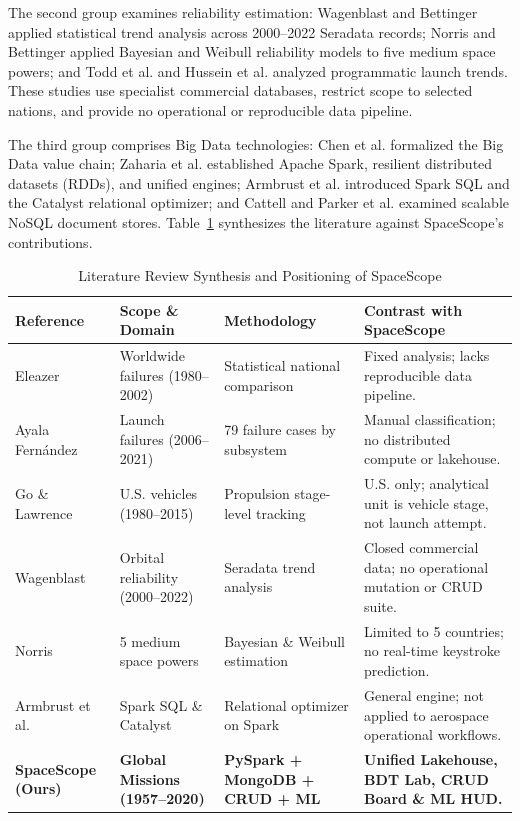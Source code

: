 \documentclass[10pt]{article}
\begin{document}
The second group examines reliability estimation: Wagenblast and Bettinger \cite{ref5} applied statistical trend analysis across 2000--2022 Seradata records; Norris and Bettinger \cite{ref6} applied Bayesian and Weibull reliability models to five medium space powers; and Todd et al. \cite{ref7} and Hussein et al. \cite{ref8} analyzed programmatic launch trends. These studies use specialist commercial databases, restrict scope to selected nations, and provide no operational or reproducible data pipeline.

The third group comprises Big Data technologies: Chen et al. \cite{ref11} formalized the Big Data value chain; Zaharia et al. \cite{ref13,ref14,ref15} established Apache Spark, resilient distributed datasets (RDDs), and unified engines; Armbrust et al. \cite{ref16} introduced Spark SQL and the Catalyst relational optimizer; and Cattell \cite{ref19} and Parker et al. \cite{ref20} examined scalable NoSQL document stores. Table~\ref{tab:lit_review} synthesizes the literature against SpaceScope's contributions.

\begin{table}[htbp]
\centering
\caption{Literature Review Synthesis and Positioning of SpaceScope}
\label{tab:lit_review}
\scriptsize
\begin{tabularx}{\linewidth}{l p{3.2cm} p{3.6cm} X}
\toprule
\textbf{Reference} & \textbf{Scope \& Domain} & \textbf{Methodology} & \textbf{Contrast with SpaceScope} \\
\midrule
Eleazer \cite{ref1} & Worldwide failures (1980--2002) & Statistical national comparison & Fixed analysis; lacks reproducible data pipeline. \\
Ayala Fernández \cite{ref3} & Launch failures (2006--2021) & 79 failure cases by subsystem & Manual classification; no distributed compute or lakehouse. \\
Go \& Lawrence \cite{ref4} & U.S. vehicles (1980--2015) & Propulsion stage-level tracking & U.S. only; analytical unit is vehicle stage, not launch attempt. \\
Wagenblast \cite{ref5} & Orbital reliability (2000--2022) & Seradata trend analysis & Closed commercial data; no operational mutation or CRUD suite. \\
Norris \cite{ref6} & 5 medium space powers & Bayesian \& Weibull estimation & Limited to 5 countries; no real-time keystroke prediction. \\
Armbrust et al. \cite{ref16} & Spark SQL \& Catalyst & Relational optimizer on Spark & General engine; not applied to aerospace operational workflows. \\
\textbf{SpaceScope (Ours)} & \textbf{Global Missions (1957--2020)} & \textbf{PySpark + MongoDB + CRUD + ML} & \textbf{Unified Lakehouse, BDT Lab, CRUD Board \& ML HUD.} \\
\bottomrule
\end{tabularx}
\end{table}
\end{document}
